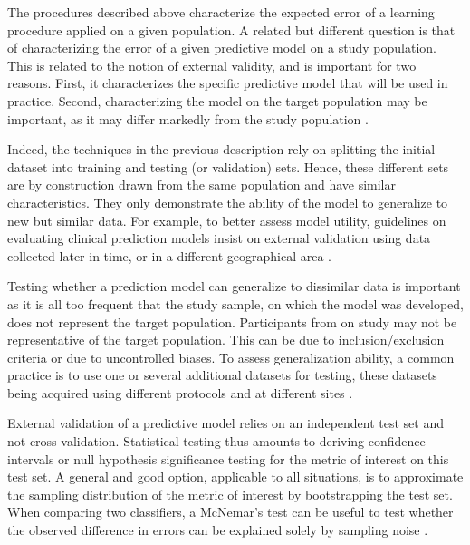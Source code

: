 \documentclass[../../../main.tex]{subfiles}
\begin{document}
The procedures described above characterize the expected error of a learning procedure applied on a given population. A related but different question is that of characterizing the error of a given predictive model on a study population. This is related to the notion of external validity, and is important for two reasons. First, it characterizes the specific predictive model that will be used in practice. Second, characterizing the model on the target population may be important, as it may differ markedly from the study population \autocite{Varoquaux2023}.

Indeed, the techniques in the previous description rely on splitting the initial dataset into training and testing (or validation) sets. Hence, these different sets are by construction drawn from the same population and have similar characteristics. They only demonstrate the ability of the model to generalize to new but similar data. For example, to better assess model utility, guidelines on evaluating clinical prediction models insist on external validation using data collected later in time, or in a different geographical area \autocite{Varoquaux2023}.

Testing whether a prediction model can generalize to dissimilar data is important as it is all too frequent that the study sample, on which the model was developed, does not represent the target population. Participants from on study may not be representative of the target population. This can be due to inclusion/exclusion criteria or due to uncontrolled biases. To assess generalization ability, a common practice is to use one or several additional datasets for testing, these datasets being acquired using different protocols and at different sites \autocite{Varoquaux2023}.

External validation of a predictive model relies on an independent test set and not cross-validation. Statistical testing thus amounts to deriving confidence intervals or null hypothesis significance testing for the metric of interest on this test set. A general and good option, applicable to all situations, is to approximate the sampling distribution of the metric of interest by bootstrapping the test set. When comparing two classifiers, a McNemar's test can be useful to test whether the observed difference in errors can be explained solely by sampling noise \autocite{Varoquaux2023}.
\end{document}
